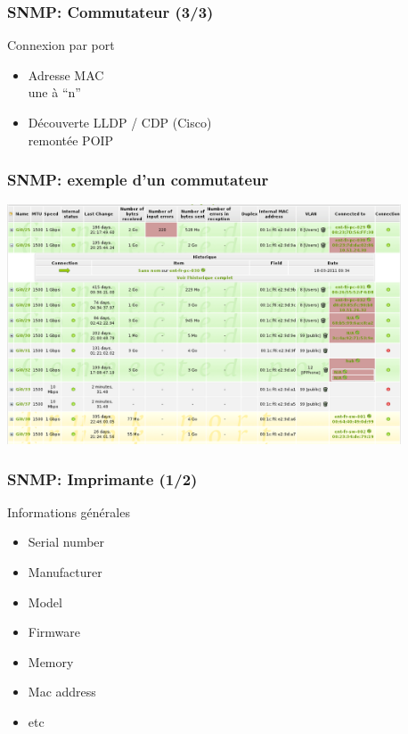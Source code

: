 \documentclass{beamer}
\begin{document}
\begin{frame}
    \frametitle{SNMP: Commutateur (3/3)}

    \begin{block}{Connexion par port}
    \begin{itemize}
    \item Adresse MAC \\ 
    \small{une à “n”}
    \item Découverte LLDP / CDP (Cisco) \\
    \small{remontée POIP}
    \end{itemize}
    \end{block}
\end{frame}

\begin{frame}
    \frametitle{SNMP: exemple d'un commutateur}

    \begin{center}
    \includegraphics[width=11.7cm]{./pics/switch_ports.png}
    \end{center}
\end{frame}

\begin{frame}
    \frametitle{SNMP: Imprimante (1/2)}

    \begin{block}{Informations générales}
    \begin{itemize}
    \item Serial number
    \item Manufacturer
    \item Model
    \item Firmware
    \item Memory
    \item Mac address
    \item etc
    \end{itemize}
    \end{block}
\end{frame}
\end{document}
